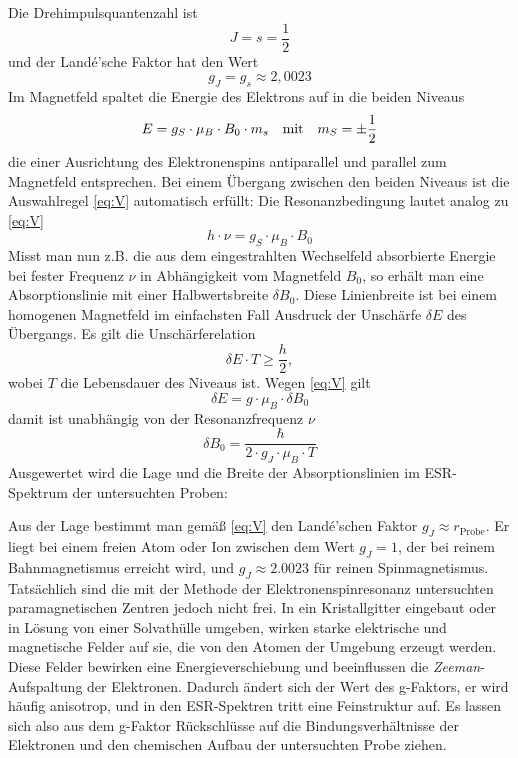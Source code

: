\documentclass[ngerman]{scrartcl}
\begin{document}
Die Drehimpulsquantenzahl ist
\begin{equation*}
    J = s = \frac{1}{2}
\end{equation*}
und der Landé'sche Faktor hat den Wert
\begin{equation*}
    g_J = g_s \approx 2,0023
\end{equation*}
Im Magnetfeld spaltet die Energie des Elektrons auf in die beiden Niveaus
\begin{equation}
    E = g_S \cdot \mu_B \cdot B_0 \cdot m_s \qq{mit} m_S = \pm \frac{1}{2}
\end{equation}
die einer Ausrichtung des Elektronenspins antiparallel und parallel zum Magnetfeld entsprechen. Bei einem Übergang zwischen den beiden Niveaus ist die Auswahlregel \ref{eq:V} automatisch erfüllt: Die Resonanzbedingung lautet analog zu \ref{eq:V}
\begin{equation}
    h \cdot \nu = g_S \cdot \mu_B \cdot B_0
\end{equation}
Misst man nun z.B. die aus dem eingestrahlten Wechselfeld absorbierte Energie bei fester Frequenz $\nu$ in Abhängigkeit vom Magnetfeld $B_0$, so erhält man eine Absorptionslinie mit einer Halbwertsbreite $\delta B_0$. Diese Linienbreite ist bei einem homogenen Magnetfeld im einfachsten Fall Ausdruck der Unschärfe $\delta E$ des Übergangs. Es gilt die Unschärferelation
\begin{equation}
    \delta E \cdot T \geq \frac{h}{2},
\end{equation}
wobei $T$ die Lebensdauer des Niveaus ist. Wegen \autoref{eq:V} gilt
\begin{equation}
    \delta E = g \cdot \mu_B \cdot \delta B_0
\end{equation}
damit ist unabhängig von der Resonanzfrequenz $\nu$
\begin{equation}
    \delta B_0 = \frac{\hbar}{2 \cdot g_J \cdot \mu_B \cdot T}
\end{equation}
Ausgewertet wird die Lage und die Breite der Absorptionslinien im ESR-Spektrum der untersuchten Proben:

Aus der Lage bestimmt man gemäß \autoref{eq:V} den Landé'schen Faktor $g_J \approx r_{\text{Probe}}$. Er liegt bei einem freien Atom oder Ion zwischen dem Wert $g_J = 1$, der bei reinem Bahnmagnetismus erreicht wird, und $g_J \approx \num{2.0023}$ für reinen Spinmagnetismus. Tatsächlich sind die mit der Methode der Elektronenspinresonanz untersuchten paramagnetischen Zentren jedoch nicht frei. In ein Kristallgitter eingebaut oder in Lösung von einer Solvathülle umgeben, wirken starke elektrische und magnetische Felder auf sie, die von den Atomen der Umgebung erzeugt werden. Diese Felder bewirken eine Energieverschiebung und beeinflussen die \textit{Zeeman}-Aufspaltung der Elektronen. Dadurch ändert sich der Wert des g-Faktors, er wird häufig anisotrop, und in den ESR-Spektren tritt eine Feinstruktur auf. Es lassen sich also aus dem g-Faktor Rückschlüsse
auf die Bindungsverhältnisse der Elektronen und den chemischen Aufbau der untersuchten Probe ziehen.
\end{document}

